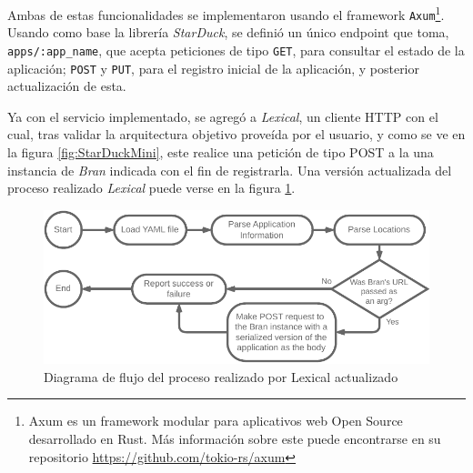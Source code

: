 Ambas de estas funcionalidades se implementaron usando el framework \texttt{Axum}\footnote{Axum es un framework modular para aplicativos web Open Source desarrollado en Rust. Más información sobre este puede encontrarse en su repositorio \url{https://github.com/tokio-rs/axum}}. Usando como base la librería \textit{StarDuck}, se definió un único endpoint que toma, \texttt{apps/:app\_name}, que acepta peticiones de tipo \texttt{GET}, para consultar el estado de la aplicación; \texttt{POST} y \texttt{PUT}, para el registro inicial de la aplicación, y posterior actualización de esta. 

Ya con el servicio implementado, se agregó a \textit{Lexical}, un cliente HTTP con el cual, tras validar la arquitectura objetivo proveída por el usuario, y como se ve en la figura \ref{fig:StarDuckMini}, este realice una petición de tipo POST a la una instancia de \textit{Bran} indicada con el fin de registrarla. Una versión actualizada del proceso realizado \textit{Lexical} puede verse en la figura \ref{fig:UpdatedLexicalFlow}.

\begin{figure}[ht]
    \centering
    \caption{Diagrama de flujo del proceso realizado por Lexical actualizado}
    \label{fig:UpdatedLexicalFlow}
    \includegraphics[width=0.9\linewidth]{images/UpdatedLexicalFlow.pdf}
\end{figure}